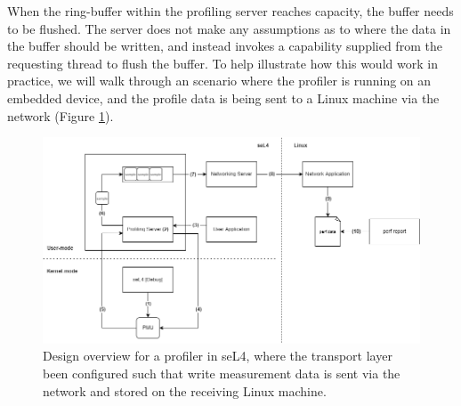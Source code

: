 When the ring-buffer within the profiling server reaches capacity, the buffer needs to be flushed. The server does not make any assumptions as to where the data in the buffer should be written, and instead invokes a capability supplied from the requesting thread to flush the buffer. To help illustrate how this would work in practice, we will walk through an scenario where the profiler is running on an embedded device, and the profile data is being sent to a Linux machine via the network (Figure \ref{fig:profiler_design}). 

\begin{figure}[h!]
    \includegraphics[width=\linewidth]{thesis_a_design_overview.drawio}
    \caption{Design overview for a profiler in seL4, where the transport layer been configured such that write measurement data is sent via the network and stored on the receiving Linux machine.}
    \label{fig:profiler_design}
\end{figure}

